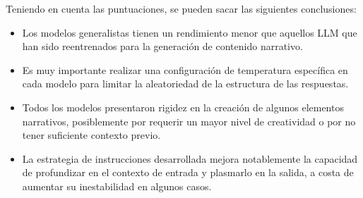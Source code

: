 \begin{table}[h]
\centering
\caption{Tabla resumen de los ensayos con \textit{prompting} preciso.}
\label{tab:results-prompt}
\end{table}

\pagebreak
Teniendo en cuenta las puntuaciones, se pueden sacar las siguientes conclusiones:

\begin{itemize}
\item Los modelos generalistas tienen un rendimiento menor que aquellos LLM
	  que han sido reentrenados para la generación de contenido narrativo.
\item Es muy importante realizar una configuración de temperatura específica
      en cada modelo para limitar la aleatoriedad de la estructura de las respuestas.
\item Todos los modelos presentaron rigidez en la creación de algunos elementos narrativos,
	  posiblemente por requerir un mayor nivel de creatividad o por no tener suficiente contexto previo.
\item La estrategia de instrucciones desarrollada mejora notablemente la capacidad de profundizar en el
      contexto de entrada y plasmarlo en la salida, a costa de aumentar su inestabilidad en algunos casos.
\end{itemize}

